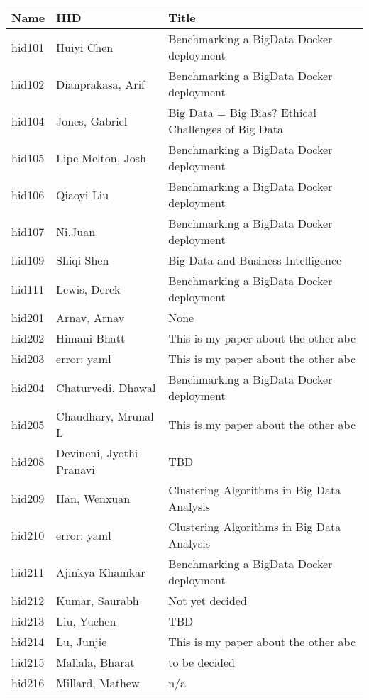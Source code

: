 \documentclass[12pt]{book}
\begin{document}
\begin{footnotesize}
\begin{longtable}{|p{1cm}p{5cm}p{9cm}|}
\hline \textbf{Name} & \textbf{HID} & \textbf{Title} \\ \hline \hline

hid101 & Huiyi Chen & Benchmarking a BigData Docker deployment  \\
\hline
hid102 & Dianprakasa, Arif & Benchmarking a BigData Docker deployment  \\
\hline
hid104 & Jones, Gabriel & Big Data = Big Bias? Ethical Challenges of Big Data  \\
\hline
hid105 & Lipe-Melton, Josh & Benchmarking a BigData Docker deployment  \\
\hline
hid106 & Qiaoyi Liu & Benchmarking a BigData Docker deployment  \\
\hline
hid107 & Ni,Juan & Benchmarking a BigData Docker deployment  \\
\hline
hid109 & Shiqi Shen & Big Data and Business Intelligence  \\
\hline
hid111 & Lewis, Derek & Benchmarking a BigData Docker deployment  \\
\hline
hid201 & Arnav, Arnav & None  \\
\hline
hid202 & Himani Bhatt & This is my paper about the other abc  \\
\hline
hid203 & error: yaml & This is my paper about the other abc  \\
\hline
hid204 & Chaturvedi, Dhawal & Benchmarking a BigData Docker deployment  \\
\hline
hid205 & Chaudhary, Mrunal L & This is my paper about the other abc  \\
\hline
hid208 & Devineni, Jyothi Pranavi & TBD  \\
\hline
hid209 & Han, Wenxuan & Clustering Algorithms in Big Data Analysis  \\
\hline
hid210 & error: yaml & Clustering Algorithms in Big Data Analysis  \\
\hline
hid211 & Ajinkya Khamkar & Benchmarking a BigData Docker deployment  \\
\hline
hid212 & Kumar, Saurabh & Not yet decided  \\
\hline
hid213 & Liu, Yuchen & TBD  \\
\hline
hid214 & Lu, Junjie & This is my paper about the other abc  \\
\hline
hid215 & Mallala, Bharat & to be decided  \\
\hline
hid216 & Millard, Mathew & n/a  \\

\end{longtable}
\end{footnotesize}
\end{document}
